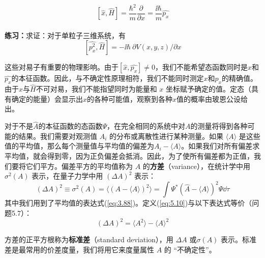 \begin{examplebox}
\begin{equation*}
\begin{aligned}
            \end{aligned}
        \end{equation*}
        \begin{equation}
            \left[\hat{x},\hat{H}\right] = \frac{\hbar^2}{m}\frac{\partial}{\partial x} = \frac{\ii \hbar}{m}\hat{p_x}
            \label{eq:5.8}
        \end{equation}
        \\
        \textbf{练习：}求证：对于单粒子三维系统，有
        \begin{equation}
            \left[\hat{p_x^2},\hat{H}\right] = -\ii \hbar \:\partial V\left(x,y,z\right)/\partial x
            \label{eq:5.9}
        \end{equation}
    \end{examplebox}

    这些对易子有重要的物理影响。由于$\left[\hat{x},\hat{p_x}\right] \neq 0$，我们不能希望态函数同时是$\hat{x}$和$\hat{p_x}$的本征函数。因此，与不确定性原理相符，我们不能同时测定$x$和$p_x$的精确值。由于$\hat{x}$与$\hat{H}$不可对易，我们不能指望同时为能量和 $x$ 坐标赋予确定的值。定态（具有确定的能量）会显示出$x$的各种可能值，观察到各种$x$值的概率由玻恩公设给出。

    对于不是$\hat{A}$的本征函数的态函数$\Psi$，在完全相同的系统中对$A$的测量将得到各种可能的结果。我们需要对观测值 $A_i$ 的分布或离散性进行某种测量。如果 $\langle A \rangle$ 是这些值的平均值，那么每个测量值与平均值的偏差为$A_i - \langle A \rangle$。如果我们对所有偏差求平均值，就会得到零，因为正负偏差会抵消。因此，为了使所有偏差都为正值，我们要将它们平方。偏差平方的平均值称为 $A$ 的\textbf{方差}（variance），在统计学中用 $\sigma^2\left(A\right)$ 表示，在量子力学中用 $\left(\Delta A\right)^2$ 表示：
    \begin{equation}
        \left(\Delta A\right)^2 \equiv \sigma^2\left(A\right) = \langle \left(A - \langle A \rangle\right)^2 \rangle = \int \Psi^{\ast}\left(\hat{A}-\langle A \rangle\right)^2\Psi\dd \tau
        \label{eq:5.10}
    \end{equation}
    其中我们用到了平均值的表达式(\ref{eq:3.88})。定义(\ref{eq:5.10})与以下表达式等价（问题5.7）：
    \begin{equation}
        \left(\Delta A\right)^2 = \langle A^2 \rangle - \langle A \rangle^2
        \label{eq:5.11}
    \end{equation}

    方差的正平方根称为\textbf{标准差}（standard deviation），用 $\Delta A$ 或$\sigma\left(A\right)$ 表示。标准差是最常用的价差度量，我们将用它来度量属性 $A$ 的 “不确定性”。

